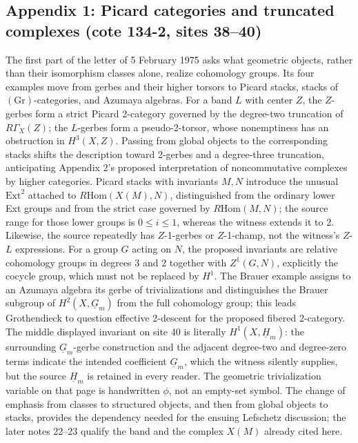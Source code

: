 \subsection*{Appendix 1: Picard categories and truncated complexes (cote 134-2, sites 38--40)}
The first part of the letter of 5 February 1975 asks what geometric objects, rather than their isomorphism classes alone, realize cohomology groups. Its four examples move from gerbes and their higher torsors to Picard stacks, stacks of $(\mathrm{Gr})$-categories, and Azumaya algebras. For a band $L$ with center $Z$, the $Z$-gerbes form a strict Picard 2-category governed by the degree-two truncation of $R\Gamma_X(Z)$; the $L$-gerbes form a pseudo-2-torsor, whose nonemptiness has an obstruction in $H^3(X,Z)$. Passing from global objects to the corresponding stacks shifts the description toward 2-gerbes and a degree-three truncation, anticipating Appendix 2's proposed interpretation of noncommutative complexes by higher categories. Picard stacks with invariants $M,N$ introduce the unusual $\mathrm{Ext}^2$ attached to $R\mathrm{Hom}(X(M),N)$, distinguished from the ordinary lower Ext groups and from the strict case governed by $R\mathrm{Hom}(M,N)$; the source range for those lower groups is $0\leq i\leq1$, whereas the witness extends it to 2. Likewise, the source repeatedly has $Z$-1-gerbes or $Z$-1-champ, not the witness's $Z$-$L$ expressions. For a group $G$ acting on $N$, the proposed invariants are relative cohomology groups in degrees 3 and 2 together with $Z^1(G,N)$, explicitly the cocycle group, which must not be replaced by $H^1$. The Brauer example assigns to an Azumaya algebra its gerbe of trivializations and distinguishes the Brauer subgroup of $H^2(X,\underline G_m)$ from the full cohomology group; this leads Grothendieck to question effective 2-descent for the proposed fibered 2-category. The middle displayed invariant on site 40 is literally $H^1(X,\underline H_m)$: the surrounding $\underline G_m$-gerbe construction and the adjacent degree-two and degree-zero terms indicate the intended coefficient $\underline G_m$, which the witness silently supplies, but the source $\underline H_m$ is retained in every reader. The geometric trivialization variable on that page is handwritten $\phi$, not an empty-set symbol. The change of emphasis from classes to structured objects, and then from global objects to stacks, provides the dependency needed for the ensuing Lefschetz discussion; the later notes 22--23 qualify the band and the complex $X(M)$ already cited here.

